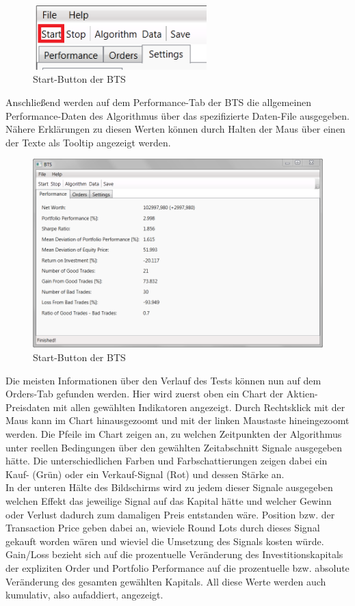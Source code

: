 \begin{figure}[H]
\centering
\includegraphics[width=0.6\textwidth]{images/btsstart.png}
\caption{Start-Button der \gls{BTS}}
\end{figure}

Anschließend werden auf dem Performance-Tab der \gls{BTS} die allgemeinen Performance-Daten des Algorithmus über das spezifizierte Daten-File ausgegeben. Nähere Erklärungen zu diesen Werten können durch Halten der Maus über einen der Texte als Tooltip angezeigt werden.

\begin{figure}[H]
\centering
\includegraphics[width=1\textwidth]{images/btsperformance.png}
\caption{Start-Button der \gls{BTS}}
\end{figure}

Die meisten Informationen über den Verlauf des Tests können nun auf dem Orders-Tab gefunden werden. Hier wird zuerst oben ein Chart der Aktien-Preisdaten mit allen gewählten Indikatoren angezeigt. Durch Rechtsklick mit der Maus kann im Chart hinausgezoomt und mit der linken Maustaste hineingezoomt werden. Die Pfeile im Chart zeigen an, zu welchen Zeitpunkten der Algorithmus unter reellen Bedingungen über den gewählten Zeitabschnitt Signale ausgegeben hätte. Die unterschiedlichen Farben und Farbschattierungen zeigen dabei ein Kauf- (Grün) oder ein Verkauf-Signal (Rot) und dessen Stärke an.\\
In der unteren Hälte des Bildschirms wird zu jedem dieser Signale ausgegeben welchen Effekt das jeweilige Signal auf das Kapital hätte und welcher Gewinn oder Verlust dadurch zum damaligen Preis entstanden wäre. Position bzw. der Transaction Price geben dabei an, wieviele Round Lots durch dieses Signal gekauft worden wären und wieviel die Umsetzung des Signals kosten würde. Gain/Loss bezieht sich auf die prozentuelle Veränderung des Investitionskapitals der expliziten Order und Portfolio Performance auf die prozentuelle bzw. absolute Veränderung des gesamten gewählten Kapitals. All diese Werte werden auch kumulativ, also aufaddiert, angezeigt. 

